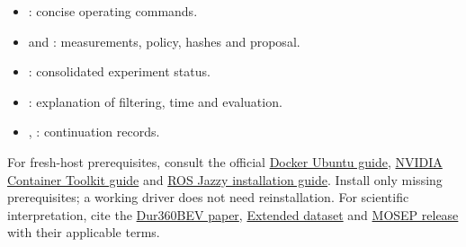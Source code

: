 \documentclass[11pt,a4paper]{article}
\begin{document}
\begin{itemize}
\item {}: concise operating commands.
\item {} and
: measurements, policy, hashes and proposal.
\item {}: consolidated experiment status.
\item {}: explanation of filtering, time and evaluation.
\item {}, : continuation records.
\end{itemize}
For fresh-host prerequisites, consult the official
\href{https://docs.docker.com/engine/install/ubuntu/}{Docker Ubuntu guide},
\href{https://docs.nvidia.com/datacenter/cloud-native/container-toolkit/latest/install-guide.html}{NVIDIA Container Toolkit guide}
and \href{https://docs.ros.org/en/jazzy/Installation/Ubuntu-Install-Debs.html}{ROS Jazzy installation guide}.
Install only missing prerequisites; a working driver does not need reinstallation.
For scientific interpretation, cite the
\href{https://arxiv.org/html/2503.00675v2}{Dur360BEV paper},
\href{https://huggingface.co/datasets/TomEeee/Dur360BEV-Extended}{Extended dataset}
and \href{https://zenodo.org/records/19353314}{MOSEP release} with their applicable terms.
\end{document}
